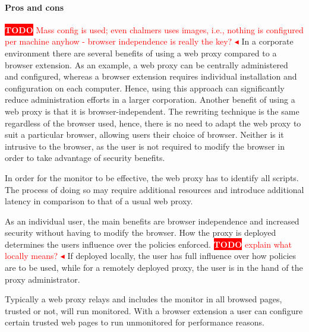 \documentclass{llncs}
\newcommand{\todo}[1]{\colorbox{red}{\textcolor{white}{\sffamily\bfseries\scriptsize TODO}} \textcolor{red}{#1} \textcolor{red}{$\blacktriangleleft$}}
\begin{document}
\paragraph{Pros and cons}
\todo{Mass config is used; even chalmers uses images, i.e., nothing is configured per machine anyhow - browser independence is really
the key?}
In a corporate environment there are several benefits of using a web proxy 
compared to a browser extension. As an example, a web proxy can be centrally 
administered and configured, whereas a browser extension requires individual installation 
and configuration on each computer. Hence, using this approach can significantly 
reduce administration efforts in a larger corporation. 
Another benefit of using a web proxy is that it is browser-independent. The 
rewriting technique is the same regardless of the browser used, hence, there is no 
need to adapt the web proxy to suit a particular browser, allowing 
users their choice of browser.
Neither is it intrusive to the browser, as the user is not required to modify the 
browser in order to take advantage of security benefits. 

In order for the monitor to be effective, the web proxy 
has to identify all scripts. The process of doing so may require additional 
resources and introduce additional 
latency in comparison to that of a usual web proxy.

As an individual user, the main benefits are browser independence and  
increased security without having to modify the browser. How the proxy is 
deployed determines the users influence over 
the policies enforced.
\todo{explain what locally means?}
If deployed locally, the user has full influence over 
how policies are to be used, while for a remotely deployed proxy, the user is 
in the hand of the proxy administrator. 

Typically a web proxy relays and includes the monitor in all browsed pages, 
trusted or not, will run monitored. With a browser extension a user can
configure certain trusted web pages to run unmonitored for performance reasons.
\end{document}
